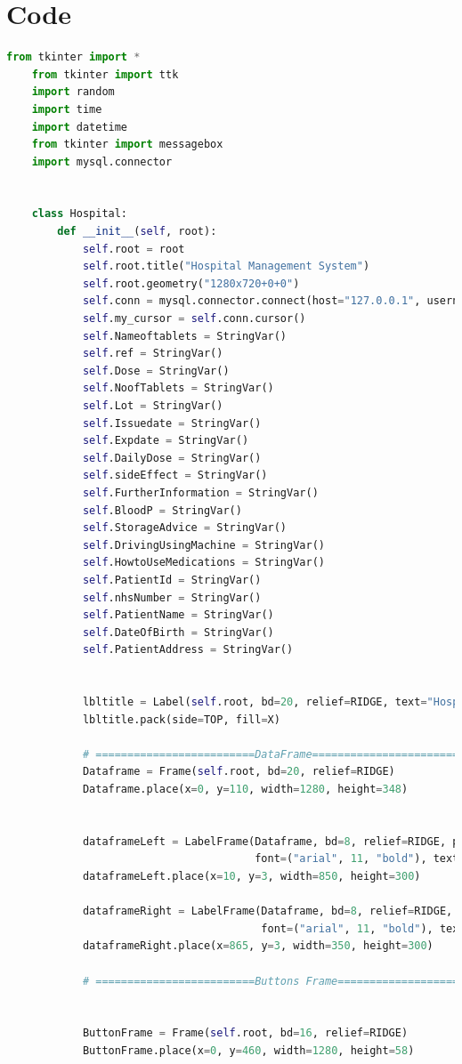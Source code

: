 \documentclass{article}
\begin{document}
\section{\textbf{Code}}
\begin{lstlisting}[language=Python, caption=Hospital Management.py]
	from tkinter import *
	from tkinter import ttk
	import random
	import time
	import datetime
	from tkinter import messagebox
	import mysql.connector
	
	
	class Hospital:
		def __init__(self, root):
			self.root = root
			self.root.title("Hospital Management System")
			self.root.geometry("1280x720+0+0")
			self.conn = mysql.connector.connect(host="127.0.0.1", username="root", password="Sayyam@123", database="mydata")
			self.my_cursor = self.conn.cursor()
			self.Nameoftablets = StringVar()
			self.ref = StringVar()
			self.Dose = StringVar()
			self.NoofTablets = StringVar()
			self.Lot = StringVar()
			self.Issuedate = StringVar()
			self.Expdate = StringVar()
			self.DailyDose = StringVar()
			self.sideEffect = StringVar()
			self.FurtherInformation = StringVar()
			self.BloodP = StringVar()
			self.StorageAdvice = StringVar()
			self.DrivingUsingMachine = StringVar()
			self.HowtoUseMedications = StringVar()
			self.PatientId = StringVar()
			self.nhsNumber = StringVar()
			self.PatientName = StringVar()
			self.DateOfBirth = StringVar()
			self.PatientAddress = StringVar()
			
	
			lbltitle = Label(self.root, bd=20, relief=RIDGE, text="Hospital Management System",fg="red", bg="white", font=("Times New Roman", 40, "bold"))
			lbltitle.pack(side=TOP, fill=X)
	
			# =========================DataFrame========================
			Dataframe = Frame(self.root, bd=20, relief=RIDGE)
			Dataframe.place(x=0, y=110, width=1280, height=348)
	
	
			dataframeLeft = LabelFrame(Dataframe, bd=8, relief=RIDGE, padx=8,
									   font=("arial", 11, "bold"), text="Patient Information")
			dataframeLeft.place(x=10, y=3, width=850, height=300)
	
			dataframeRight = LabelFrame(Dataframe, bd=8, relief=RIDGE, padx=8,
										font=("arial", 11, "bold"), text="Prescription")
			dataframeRight.place(x=865, y=3, width=350, height=300)
	
			# =========================Buttons Frame========================
	
	
			ButtonFrame = Frame(self.root, bd=16, relief=RIDGE)
			ButtonFrame.place(x=0, y=460, width=1280, height=58)
	

\end{lstlisting}
\end{document}
